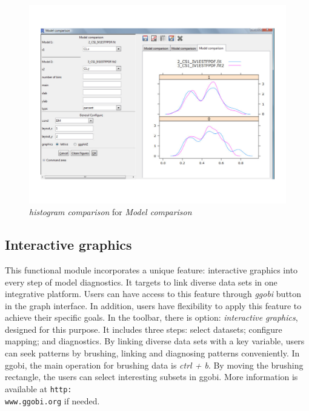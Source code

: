 \documentclass[a4paper]{article}
\begin{document}
\begin{figure}[h!tb] \centering
\includegraphics[scale=0.6]{modelcc2.pdf}
\caption{\textit{histogram comparison} for \textit{Model comparison}}
\label{modelcc2}
\end{figure}
\subsection{Interactive graphics}
This functional module incorporates a unique feature: interactive graphics into every step of model diagnostics. It targets to link diverse data sets in one integrative platform. Users can have access to this feature through \textit{ggobi} button in the graph interface. In addition, users have flexibility to apply this feature to achieve their specific goals. In the toolbar, there is option: \textit{interactive graphics}, designed for this purpose. It includes three steps: select datasets; configure mapping; and diagnostics. By linking diverse data sets with a key variable, users can seek patterns by brushing, linking and diagnosing patterns conveniently.
\newline
\newline
In ggobi, the main operation for brushing data is \textit{ctrl + b}. By moving the brushing rectangle, the users can select interesting subsets in ggobi. More information is available at \texttt{http:\\www.ggobi.org} if needed.
\end{document}
